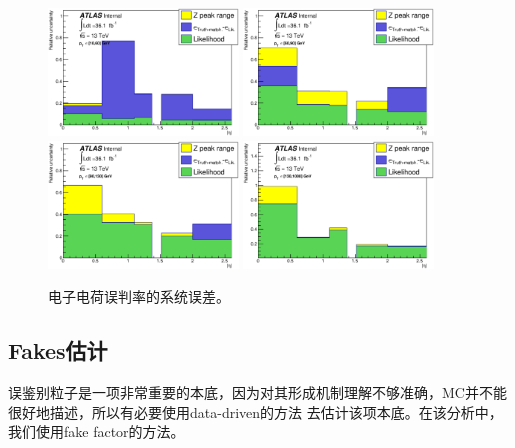 \begin{figure}[h]
\centering
  \includegraphics[width=0.45\textwidth]{fig/QmisID/Syst1_tight.eps}
  \includegraphics[width=0.45\textwidth]{fig/QmisID/Syst2_tight.eps}
  \includegraphics[width=0.45\textwidth]{fig/QmisID/Syst3_tight.eps}
  \includegraphics[width=0.45\textwidth]{fig/QmisID/Syst4_tight.eps}
  \caption{电子电荷误判率的系统误差。}
\label{fig:QmisID_syst}
\end{figure}
\clearpage
\subsection{Fakes估计}
误鉴别粒子是一项非常重要的本底，因为对其形成机制理解不够准确，MC并不能很好地描述，所以有必要使用data-driven的方法
去估计该项本底。在该分析中，我们使用fake factor的方法。

